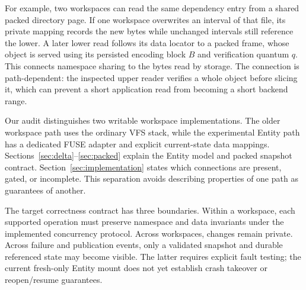 For example, two workspaces can read the same dependency entry from a shared
packed directory page. If one workspace overwrites an interval of that file,
its private mapping records the new bytes while unchanged intervals still
reference the lower. A later lower read follows its data locator to a packed
frame, whose object is served using its persisted encoding block $B$ and
verification quantum $q$. This connects namespace sharing to the bytes read
by storage. The connection is path-dependent: the inspected upper reader
verifies a whole object before slicing it, which can prevent a short
application read from becoming a short backend range.

Our audit distinguishes two writable workspace implementations. The older
workspace path uses the ordinary VFS stack, while the experimental Entity
path has a dedicated FUSE adapter and explicit current-state data mappings.
Sections~\ref{sec:delta}--\ref{sec:packed} explain the Entity model and packed
snapshot contract. Section~\ref{sec:implementation} states which connections
are present, gated, or incomplete. This separation avoids describing
properties of one path as guarantees of another.

The target correctness contract has three boundaries. Within a workspace,
each supported operation must preserve namespace and data invariants under
the implemented concurrency protocol. Across workspaces, changes remain
private. Across failure and publication events, only a validated snapshot
and durable referenced state may become visible. The latter requires
explicit fault testing; the current fresh-only Entity mount does not yet
establish crash takeover or reopen/resume guarantees.
